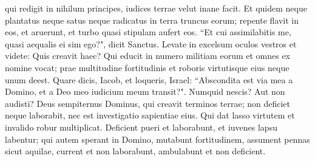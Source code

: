 \begin{biblechapter}
\verse qui redigit in nihilum principes, iudices terrae velut inane facit. 
\verse Et quidem neque plantatus neque satus neque radicatus in terra truncus eorum; repente flavit in eos, et aruerunt, et turbo quasi stipulam aufert eos. 
\verse “Et cui assimilabitis me, quasi aequalis ei sim ego?", dicit Sanctus. 
\verse Levate in excelsum oculos vestros et videte: Quis creavit haec? Qui educit in numero militiam eorum et omnes ex nomine vocat; prae multitudine fortitudinis et roboris virtutisque eius neque unum deest. 
\verse Quare dicis, Iacob, et loqueris, Israel: “Abscondita est via mea a Domino, et a Deo meo iudicium meum transit?". 
\verse Numquid nescis? Aut non audisti? Deus sempiternus Dominus, qui creavit terminos terrae; non deficiet neque laborabit, nec est investigatio sapientiae eius. 
\verse Qui dat lasso virtutem et invalido robur multiplicat. 
\verse Deficient pueri et laborabunt, et iuvenes lapsu labentur; 
\verse qui autem sperant in Domino, mutabunt fortitudinem, assument pennas sicut aquilae, current et non laborabunt, ambulabunt et non deficient. 
\end{biblechapter}

